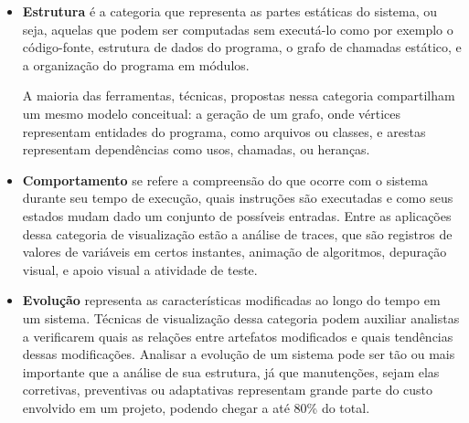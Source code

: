 \begin{itemize}
\item \textbf{Estrutura} é a categoria que representa as partes estáticas do sistema, ou seja, aquelas que podem ser computadas sem executá-lo como por exemplo o código-fonte, estrutura de dados do programa, o grafo de chamadas estático, e a organização do programa em módulos.

A maioria das ferramentas, técnicas, propostas nessa categoria compartilham um mesmo modelo conceitual: a geração de um grafo, onde vértices representam entidades do programa, como arquivos ou classes, e arestas representam dependências como usos, chamadas, ou heranças.


\item \textbf{Comportamento} se refere a compreensão do que ocorre com o sistema durante seu tempo de execução, quais instruções são executadas e como seus estados mudam dado um conjunto de possíveis entradas. Entre as aplicações dessa categoria de visualização estão a análise de traces, que são registros de valores de variáveis em certos instantes, animação de algoritmos, depuração visual, e apoio visual a atividade de teste. 


\item \textbf{Evolução} representa as características modificadas ao longo do tempo em um sistema. Técnicas de visualização dessa categoria podem auxiliar analistas a verificarem quais as relações entre artefatos modificados e quais tendências dessas modificações. Analisar a evolução de um sistema pode ser tão ou mais importante que a análise de sua estrutura, já que manutenções, sejam elas corretivas, preventivas ou adaptativas representam grande parte do custo envolvido em um projeto, podendo chegar a até 80\% do total.

%
%
%
\end{itemize}

